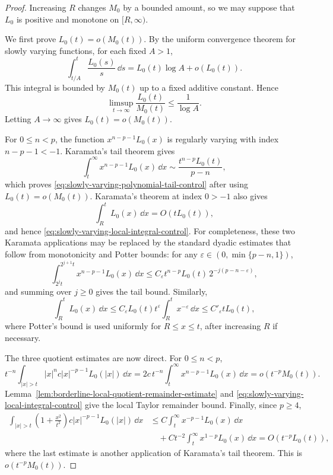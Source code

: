 \begin{proof}
Increasing \(R\) changes \(M_0\) by a bounded amount, so we may suppose that
\(L_0\) is positive and monotone on \([R,\infty)\).

We first prove \(L_0(t)=o(M_0(t))\).  By the uniform convergence theorem for
slowly varying functions, for each fixed \(A>1\),
\[
  \int_{t/A}^{t}\frac{L_0(s)}s\,\dd s
  =L_0(t)\log A+o(L_0(t)).
\]
This integral is bounded by \(M_0(t)\) up to a fixed additive constant.
Hence
\[
  \limsup_{t\to\infty}\frac{L_0(t)}{M_0(t)}\le \frac1{\log A}.
\]
Letting \(A\to\infty\) gives \(L_0(t)=o(M_0(t))\).

For \(0\le n<p\), the function \(x^{n-p-1}L_0(x)\) is regularly varying
with index \(n-p-1<-1\).  Karamata's tail theorem gives
\[
  \int_t^\infty x^{n-p-1}L_0(x)\,\dd x
  \sim \frac{t^{n-p}L_0(t)}{p-n},
\]
which proves \eqref{eq:slowly-varying-polynomial-tail-control} after using
\(L_0(t)=o(M_0(t))\).  Karamata's theorem at index \(0>-1\) also gives
\[
  \int_R^tL_0(x)\,\dd x=O(tL_0(t)),
\]
and hence \eqref{eq:slowly-varying-local-integral-control}.
For completeness, these two Karamata applications may be replaced by the
standard dyadic estimates that follow from monotonicity and Potter bounds:
for any \(\varepsilon\in(0,\min\{p-n,1\})\),
\[
\int_{2^jt}^{2^{j+1}t}x^{n-p-1}L_0(x)\,\dd x
\le C_\varepsilon
t^{n-p}L_0(t)\,2^{-j(p-n-\varepsilon)},
\]
and summing over \(j\ge0\) gives the tail bound.  Similarly,
\[
\int_R^tL_0(x)\,\dd x
\le C_\varepsilon L_0(t)t^\varepsilon
\int_R^t x^{-\varepsilon}\,\dd x
\le C'_\varepsilon tL_0(t),
\]
where Potter's bound is used uniformly for \(R\le x\le t\), after increasing
\(R\) if necessary.

The three quotient estimates are now direct.  For \(0\le n<p\),
\[
  t^{-n}\int_{|x|>t}|x|^n c|x|^{-p-1}L_0(|x|)\,\dd x
  =2c\,t^{-n}\int_t^\infty x^{n-p-1}L_0(x)\,\dd x
  =o(t^{-p}M_0(t)).
\]
Lemma~\ref{lem:borderline-local-quotient-remainder-estimate} and
\eqref{eq:slowly-varying-local-integral-control} give the local Taylor
remainder bound.  Finally, since \(p\ge4\),
\begin{align*}
  \int_{|x|>t}\left(1+\frac{x^2}{t^2}\right)
  c|x|^{-p-1}L_0(|x|)\,\dd x
  &\le C\int_t^\infty x^{-p-1}L_0(x)\,\dd x \\
  &\quad
  +Ct^{-2}\int_t^\infty x^{1-p}L_0(x)\,\dd x
  =O(t^{-p}L_0(t)),
\end{align*}
where the last estimate is another application of Karamata's tail theorem.
This is \(o(t^{-p}M_0(t))\).
\end{proof}

